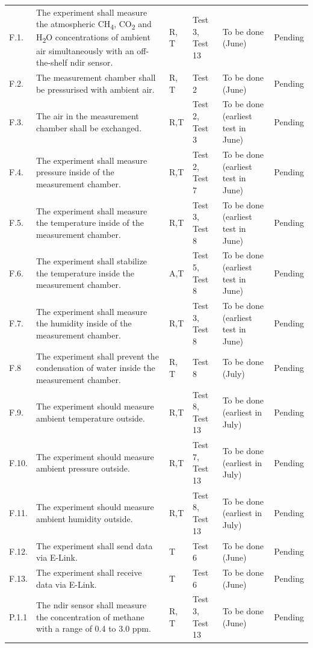 \documentclass[
  a4paper,
  11pt,
  openany,
  parskip,
  toc=totoc,
  listof=totoc,
  bibliography=totoc
]{scrreprt}
\begin{document}
\begin{longtable}{L{0.7cm}L{5cm}L{1.5cm}L{2cm}L{2.5cm}L{2cm}}
F.1. & The experiment shall measure the atmospheric CH\textsubscript{4}, CO\textsubscript{2} and H\textsubscript{2}O concentrations of ambient air simultaneously with an off-the-shelf \gls{ndir} sensor. & R, T & Test 3, Test 13 & To be done (June) & Pending \\
F.2. & The measurement chamber shall be pressurised with ambient air. & R, T & Test 2 & To be done (June) & Pending \\
F.3. & The air in the measurement chamber shall be exchanged. & R,T & Test 2, Test 3 & To be done (earliest test in June) & Pending \\
F.4. & The experiment shall measure pressure inside of the measurement chamber. & R,T & Test 2, Test 7 & To be done (earliest test in June) & Pending \\
F.5. & The experiment shall measure the temperature inside of the measurement chamber. & R,T & Test 3, Test 8  & To be done (earliest test in June) & Pending \\
F.6. & The experiment shall stabilize the temperature inside the measurement chamber. & A,T & Test 5, Test 8 & To be done (earliest test in June) & Pending \\
F.7. & The experiment shall measure the humidity inside of the measurement chamber. & R,T & Test 3, Test 8 & To be done (earliest test in June) & Pending \\
F.8 & The experiment shall prevent the condensation of water inside the measurement chamber. & R, T & Test 8 & To be done (July) & Pending \\
F.9. & The experiment should measure ambient temperature outside. & R,T & Test 8, Test 13 & To be done (earliest in July) & Pending \\
F.10. & The experiment should measure ambient pressure outside. & R,T &  Test 7, Test 13 & To be done (earliest in July) & Pending \\
F.11. & The experiment should measure ambient humidity outside. & R,T &  Test 8, Test 13 & To be done (earliest in July) & Pending \\
F.12. & The experiment shall send data via E-Link. & T & Test 6 & To be done (June) & Pending \\
F.13. & The experiment shall receive data via E-Link. & T & Test 6 & To be done (June) & Pending \\
P.1.1 & The \gls{ndir} sensor shall measure the concentration of methane with a range of 0.4 to 3.0 ppm. & R, T & Test 3, Test 13 & To be done (June) & Pending \\

\end{longtable}
\end{document}
